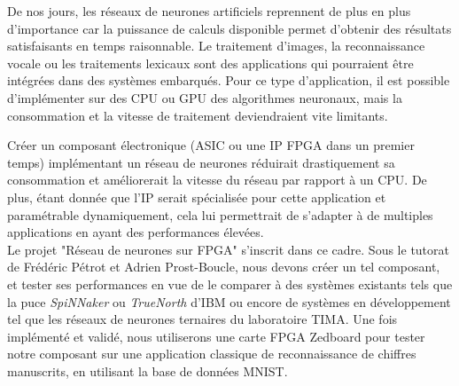 De nos jours, les réseaux de neurones artificiels reprennent de plus en plus d'importance car la puissance de calculs disponible permet d'obtenir des résultats satisfaisants en temps raisonnable.
Le traitement d'images, la reconnaissance vocale ou les traitements lexicaux sont
des applications qui pourraient être intégrées dans des systèmes embarqués. Pour ce type d'application, il est possible
d'implémenter sur des CPU ou GPU des algorithmes neuronaux, mais la consommation et la vitesse de traitement deviendraient vite limitants.

Créer un composant électronique (ASIC ou une IP FPGA dans un premier temps) implémentant un réseau de neurones réduirait drastiquement sa consommation
et améliorerait la vitesse du réseau par rapport à un CPU.
De plus, étant donnée que l'IP serait spécialisée pour cette application et paramétrable dynamiquement,
cela lui permettrait de s'adapter à de multiples applications en ayant des performances élevées.\\

Le projet "Réseau de neurones sur FPGA" s'inscrit dans ce cadre. Sous le tutorat
de Frédéric Pétrot et Adrien Prost-Boucle, nous devons créer un tel composant,
et tester ses performances en vue de le comparer à des systèmes existants tels
que la puce {\em SpiNNaker}\cite{painkras2013spinnaker} ou {\em TrueNorth}\cite{modha2014introducing} d'IBM ou encore de systèmes en développement
tel que les réseaux de neurones ternaires du laboratoire TIMA. Une fois
implémenté et validé, nous utiliserons une carte FPGA Zedboard pour tester notre
composant sur une application classique de reconnaissance de chiffres manuscrits,
en utilisant la base de données MNIST\cite{lecun2010mnist}.
